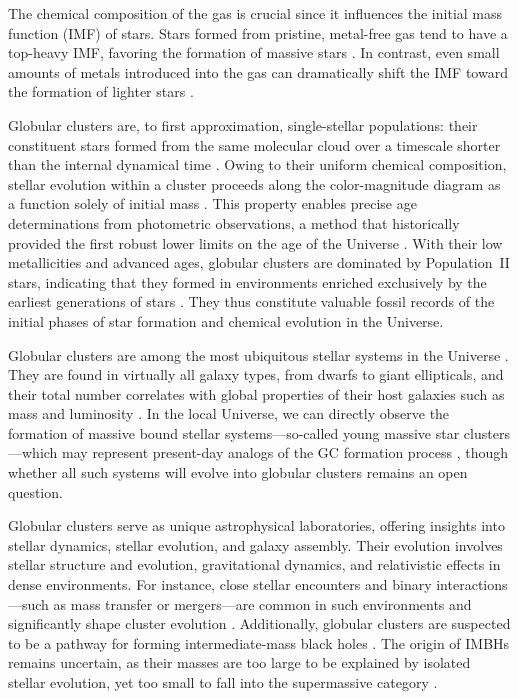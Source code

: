 \documentclass{article}
\begin{document}
    The chemical composition of the gas is crucial since it influences the initial mass function (IMF) of stars. Stars formed from pristine, metal-free gas tend to have a top-heavy IMF, favoring the formation of massive stars \citep{2002ApJ...571...30S,2006MNRAS.369..825S}. In contrast, even small amounts of metals introduced into the gas can dramatically shift the IMF toward the formation of lighter stars \citep{2021MNRAS.508.4175C}.

    Globular clusters are, to first approximation, single-stellar populations: their constituent stars formed from the same molecular cloud over a timescale shorter than the internal dynamical time \citep{1988ApJ...324..288A,2009MNRAS.397..954F,2014PhR...539...49K}. Owing to their uniform chemical composition, stellar evolution within a cluster proceeds along the color-magnitude diagram as a function solely of initial mass \citep{2013sse..book.....K}. This property enables precise age determinations from photometric observations, a method that historically provided the first robust lower limits on the age of the Universe \citep{1959MNRAS.119..124H,1970ApJ...162..841S,1985A&A...147..169G,1992ApJ...400..265M}. With their low metallicities and advanced ages, globular clusters are dominated by Population~II stars, indicating that they formed in environments enriched exclusively by the earliest generations of stars \citep{2022A&A...668A.191C}. They thus constitute valuable fossil records of the initial phases of star formation and chemical evolution in the Universe.
    
    Globular clusters are among the most ubiquitous stellar systems in the Universe \citep{2006ARA&A..44..193B,2019ARA&A..57..227K}. They are found in virtually all galaxy types, from dwarfs to giant ellipticals, and their total number correlates with global properties of their host galaxies such as mass and luminosity \citep[e.g.,][]{2013ApJ...772...82H,2018MNRAS.481.5592F}. In the local Universe, we can directly observe the formation of massive bound stellar systems—so-called young massive star clusters—which may represent present-day analogs of the GC formation process \citep[e.g.,][]{2010ARA&A..48..431P,2020SSRv..216...69A}, though whether all such systems will evolve into globular clusters remains an open question.

    Globular clusters serve as unique astrophysical laboratories, offering insights into stellar dynamics, stellar evolution, and galaxy assembly. Their evolution involves stellar structure and evolution, gravitational dynamics, and relativistic effects in dense environments. For instance, close stellar encounters and binary interactions—such as mass transfer or mergers—are common in such environments and significantly shape cluster evolution \citep{2004MNRAS.349..129D,2016MNRAS.458.1450W,2024MNRAS.528.5119A}. Additionally, globular clusters are suspected to be a pathway for forming intermediate-mass black holes \citep{2013MNRAS.432.2779B,2015MNRAS.454.3150G}. The origin of IMBHs remains uncertain, as their masses are too large to be explained by isolated stellar evolution, yet too small to fall into the supermassive category \citep{2020ARA&A..58..257G}. 
    
\end{document}
